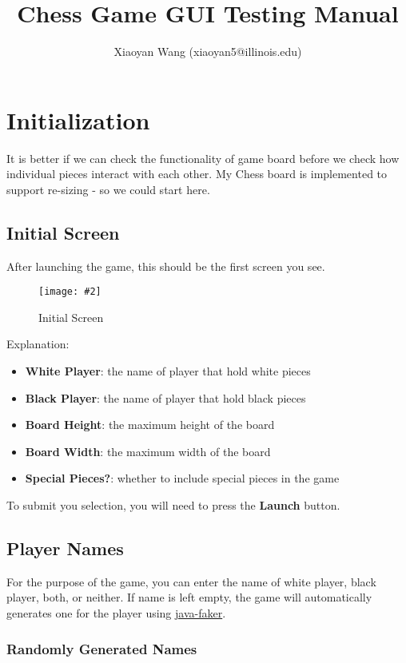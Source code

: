 \documentclass[12pt]{article}
\title{Chess Game GUI Testing Manual}
\author{Xiaoyan Wang (xiaoyan5@illinois.edu)}
\newcommand{\img}[3]{
\begin{figure}[!ht]
\begin{center}
\texttt{[image: \#2]}
\caption{#3}\label{#2}
\end{center}
\end{figure}
}
\newcommand{\B}[1]{\textbf{#1}}
\begin{document}
\maketitle

\section{Initialization}

It is better if we can check the functionality of game board before
we check how individual pieces interact with each other. My Chess board
is implemented to support re-sizing - so we could start here.

\subsection{Initial Screen}

After launching the game, this should be the first screen you see.
\img{0.7}{init_empty}{Initial Screen}

\noindent Explanation:
\begin{itemize}
    \item \B{White Player}: the name of player that hold white pieces
    \item \B{Black Player}: the name of player that hold black pieces
    \item \B{Board Height}: the maximum height of the board
    \item \B{Board Width}: the maximum width of the board
    \item \B{Special Pieces?}: whether to include special pieces in the game
\end{itemize}

To submit you selection, you will need to press the \B{Launch} button.


\subsection{Player Names}

For the purpose of the game, you can enter the name of white player, black player, both, or neither. If name is left empty, the game will automatically generates one for the player using \href{https://github.com/DiUS/java-faker}{java-faker}.

\subsubsection{Randomly Generated Names}
\end{document}

